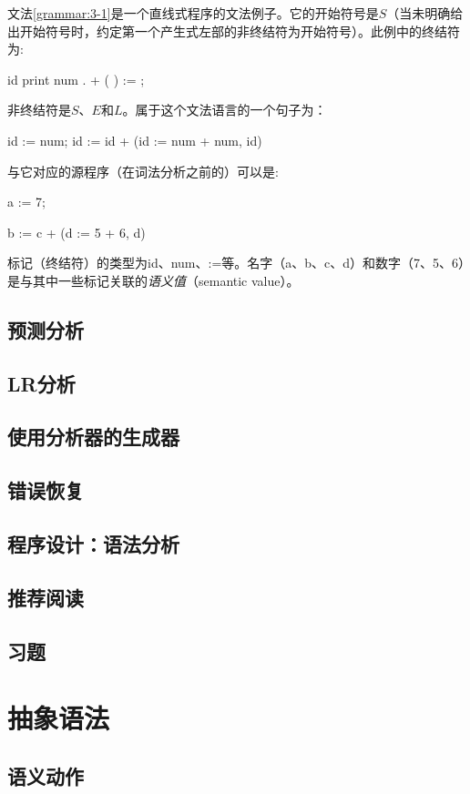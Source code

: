 \documentclass[cn,11pt,chinese]{elegantbook}
\begin{document}
文法\ref{grammar:3-1}是一个直线式程序的文法例子。它的开始符号是$S$（当未明确给出开始符号时，约定第一个产生式左部的非终结符为开始符号）。此例中的终结符为:

id print num . + ( ) := ;

非终结符是$S$、$E$和$L$。属于这个文法语言的一个句子为：

id := num; id := id + (id := num + num, id)

与它对应的源程序（在词法分析之前的）可以是:

a := 7;

b := c + (d := 5 + 6, d)

标记（终结符）的类型为id、num、:=等。名字（a、b、c、d）和数字（7、5、6）是与其中一些标记关联的\textit{语义值}（semantic value）。

\section{预测分析}

\section{LR分析}

\section{使用分析器的生成器}

\section{错误恢复}

\section{程序设计：语法分析}

\section{推荐阅读}

\section{习题}

\chapter{抽象语法}

\section{语义动作}
\end{document}
